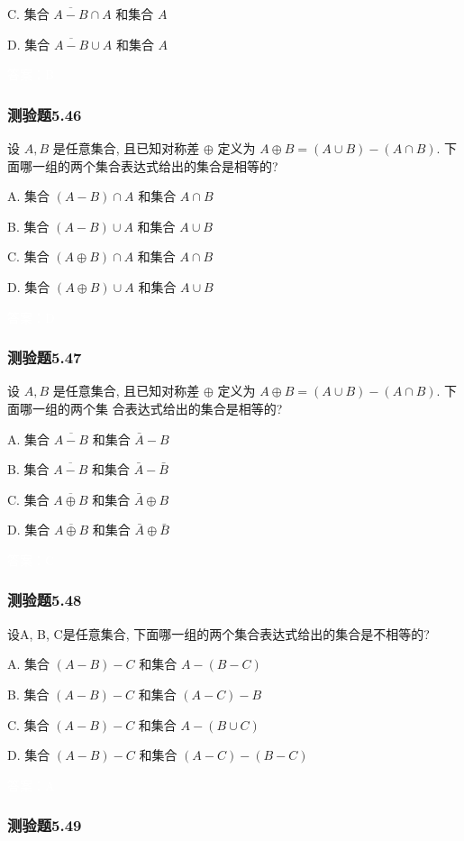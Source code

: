 \documentclass[UTF8, heading=true]{ctexart}
\begin{document}
C. 集合 $\overline{A-B} \cap A$ 和集合 $A$

D.  集合 $\overline{A-B} \cup A$ 和集合 $A$

\textcolor{white}{答案：B}

\subsubsection{测验题5.46}
设 $A, B$ 是任意集合, 且已知对称差 $\oplus$ 定义为 $A \oplus B=(A \cup B)-(A \cap B)$. 下面哪一组的两个集合表达式给出的集合是相等的?

A. 集合 $(A-B) \cap A$ 和集合 $A \cap B$

B. 集合 $(A-B) \cup A$ 和集合 $A \cup B$

C. 集合 $(A \oplus B) \cap A$ 和集合 $A \cap B$

D. 集合 $(A \oplus B) \cup A$ 和集合 $A \cup B$

\textcolor{white}{答案：D}


\subsubsection{测验题5.47}

设 $A, B$ 是任意集合, 且已知对称差 $\oplus$ 定义为 $A \oplus B=(A \cup B)-(A \cap B)$. 下面哪一组的两个集
合表达式给出的集合是相等的?

A. 集合 $\overline{A-B}$ 和集合 $\bar{A}-B$

B. 集合 $\overline{A-B}$ 和集合 $\bar{A}-\bar{B}$

C. 集合 $\overline{A \oplus B}$ 和集合 $\bar{A} \oplus B$

D. 集合 $\overline{A \oplus B}$ 和集合 $\bar{A} \oplus \bar{B}$

\textcolor{white}{答案：C}

\subsubsection{测验题5.48}
设A, B, C是任意集合, 下面哪一组的两个集合表达式给出的集合是不相等的?

A. 
集合 $(A-B)-C$ 和集合 $A-(B-C)$

B. 
集合 $(A-B)-C$ 和集合 $(A-C)-B$

C. 
集合 $(A-B)-C$ 和集合 $A-(B \cup C)$

D. 
集合 $(A-B)-C$ 和集合 $(A-C)-(B-C)$

\textcolor{white}{答案：A}

\subsubsection{测验题5.49}
\end{document}
